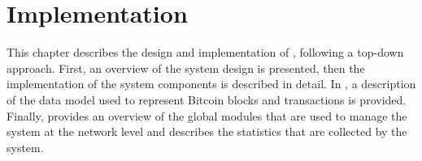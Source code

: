 \chapter{Implementation}\label{ch:implementation}

This chapter describes the design and implementation of \iblock{}, following a
top-down approach. First, an overview of the system design is presented, then
the implementation of the system components is described in detail. In
, a description of the data model used to represent
Bitcoin blocks and transactions is provided. Finally, 
provides an overview of the global modules that are used to manage the system
at the network level and  describes the statistics that
are collected by the system.







